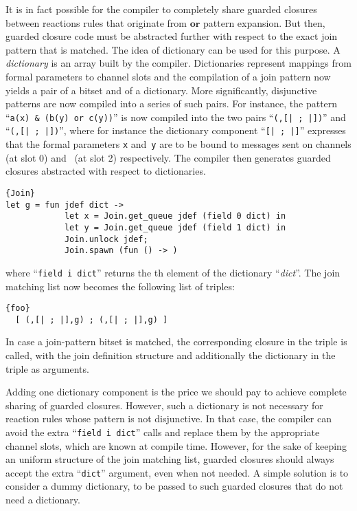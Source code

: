 \documentclass{LMCS}
\let \lst \lstinline
\newcommand{\kwd}[1]{\ensuremath{\mathbf{#1}}}
\newcommand{\id}[1]{\textit{#1}}
\renewcommand{\_}{\mathord{\rule[-.25ex]{1ex}{.15ex}}}
\begin{document}
It is in fact possible for the compiler to completely share guarded
closures between reactions rules that originate from \kwd{or} pattern
expansion.  But then, guarded closure code must be abstracted further
with respect to the exact join pattern that is matched.  The idea of
dictionary can be used for this purpose. A \emph{dictionary} is
an array built by the compiler.  Dictionaries represent mappings from
formal parameters to channel slots and the compilation of a join
pattern now yields a pair of a bitset and of a dictionary.  More
significantly, disjunctive patterns are now compiled into a series of
such pairs.  For instance, the pattern ``\lst|a(x) & (b(y) or c(y))|''
is now compiled into the two pairs ``\lst!(,[| ; |])!''
and ``\lst!(,[| ; |])!'', where for instance the dictionary
component ``\lst![| ; |]!'' expresses that the formal parameters
\lst|x| and~\lst|y| are to be bound to messages sent on channels
 (at slot 0) and~ (at slot 2) respectively.  The
compiler then generates guarded closures abstracted with respect to
dictionaries.
\begin{lstlisting}{Join}
let g = fun jdef dict -> 
            let x = Join.get_queue jdef (field 0 dict) in
            let y = Join.get_queue jdef (field 1 dict) in
            Join.unlock jdef;
            Join.spawn (fun () -> )
\end{lstlisting}
where ``\lst|field i dict|'' returns the th element of the
dictionary ``\id{dict}''. The join matching list now becomes the
following list of triples:
\begin{lstlisting}{foo}
  [ (,[| ; |],g) ; (,[| ; |],g) ]
\end{lstlisting}
In case a join-pattern bitset is matched, the corresponding closure in
the triple is called, with the join definition structure and
additionally the dictionary in the triple as arguments.

Adding one dictionary component is the price we should pay to achieve
complete sharing of guarded closures. However, such a dictionary is
not necessary for reaction rules whose pattern is not disjunctive.  In
that case, the compiler can avoid the extra ``\lst|field i dict|''
calls and replace them by the appropriate channel slots, which are
known at compile time.  However, for the sake of keeping an uniform
structure of the join matching list, guarded closures should always
accept the extra ``\lst|dict|'' argument, even when not needed.  A
simple solution is to consider a dummy dictionary, to be passed to
such guarded closures that do not need a dictionary.
\end{document}
